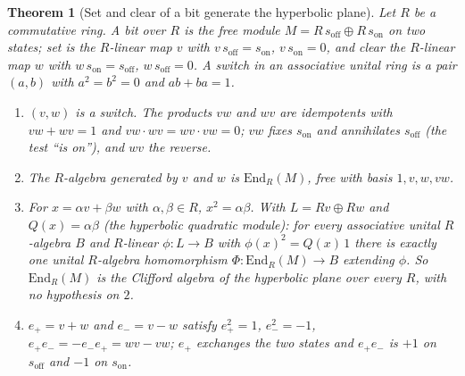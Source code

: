 \documentclass[11pt]{article}
\newtheorem{theorem}{Theorem}[section]
\theoremstyle{definition}
\theoremstyle{plain}
\newcommand{\changedmark}[2]{\marginpar{\raggedright\scriptsize\color{#1}#2}}
\begin{document}
\begin{theorem}[Set and clear of a bit generate the hyperbolic plane]\label{c:synthesis.set-and-clear-of-a-bit-generate-the-hyperbolic-plane}
\changedmark{BurntOrange}{changed since the deposit}
Let $R$ be a commutative ring. A \emph{bit over $R$} is the free module $M = R\,s_{\mathrm{off}} \oplus R\,s_{\mathrm{on}}$ on two states; \emph{set} is the $R$-linear map $v$ with $v\,s_{\mathrm{off}} = s_{\mathrm{on}}$, $v\,s_{\mathrm{on}} = 0$, and \emph{clear} the $R$-linear map $w$ with $w\,s_{\mathrm{on}} = s_{\mathrm{off}}$, $w\,s_{\mathrm{off}} = 0$. A \emph{switch} in an associative unital ring is a pair $(a, b)$ with $a^{2} = b^{2} = 0$ and $ab + ba = 1$.
\begin{enumerate}
\item[(i)] $(v, w)$ is a switch. The products $vw$ and $wv$ are idempotents with $vw + wv = 1$ and $vw \cdot wv = wv \cdot vw = 0$; $vw$ fixes $s_{\mathrm{on}}$ and annihilates $s_{\mathrm{off}}$ (the test ``is on''), and $wv$ the reverse.
\item[(ii)] The $R$-algebra generated by $v$ and $w$ is $\mathrm{End}_{R}(M)$, free with basis $1, v, w, vw$.
\item[(iii)] For $x = \alpha v + \beta w$ with $\alpha, \beta \in R$, $x^{2} = \alpha\beta$. With $L = Rv \oplus Rw$ and $Q(x) = \alpha\beta$ (the hyperbolic quadratic module): for every associative unital $R$-algebra $B$ and $R$-linear $\phi : L \to B$ with $\phi(x)^{2} = Q(x)\,1$ there is exactly one unital $R$-algebra homomorphism $\Phi : \mathrm{End}_{R}(M) \to B$ extending $\phi$. So $\mathrm{End}_{R}(M)$ is the Clifford algebra of the hyperbolic plane over every $R$, with no hypothesis on $2$.
\item[(iv)] $e_{+} = v + w$ and $e_{-} = v - w$ satisfy $e_{+}^{2} = 1$, $e_{-}^{2} = -1$, $e_{+}e_{-} = -e_{-}e_{+} = wv - vw$; $e_{+}$ exchanges the two states and $e_{+}e_{-}$ is $+1$ on $s_{\mathrm{off}}$ and $-1$ on $s_{\mathrm{on}}$.
\end{enumerate}
\end{theorem}
\end{document}
